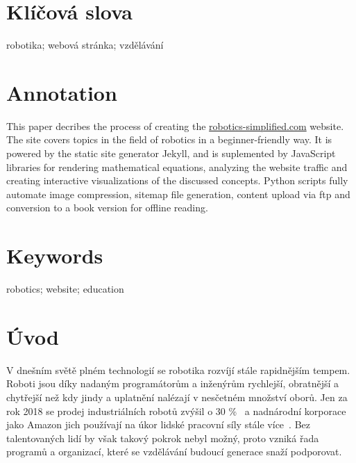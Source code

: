 \documentclass[a4paper, 12pt]{article}
\begin{document}
  \section*{\normalfont\textbf{Klíčová slova}}
  robotika; webová stránka; vzdělávání

  \section*{\normalfont\textbf{Annotation}}
  This paper decribes the process of creating the \url{robotics-simplified.com} website. The site covers topics in the field of robotics in a beginner-friendly way. It is powered by the static site generator Jekyll, and is suplemented by JavaScript libraries for rendering mathematical equations, analyzing the website traffic and creating interactive visualizations of the discussed concepts. Python scripts fully automate image compression, sitemap file generation, content upload via \acrshort{ftp} and conversion to a book version for offline reading.

  \section*{\normalfont\textbf{Keywords}}
  robotics; website; education

  \newpage

  \setcounter{savepage}{\value{page}}%

  \tableofcontents

  \newpage

  \printglossary[type=\acronymtype, title=Seznam zkratek]

  \newpage

  \section{Úvod}
  V dnešním světě plném technologií se robotika rozvíjí stále rapidnějším tempem. Roboti jsou díky nadaným programátorům a inženýrům rychlejší, obratnější a chytřejší než kdy jindy a uplatnění nalézají v nesčetném množství oborů. Jen za rok 2018 se prodej industriálních robotů zvýšil o 30 \%~\cite{industrial-robot-growth} a nadnárodní korporace jako Amazon jich používají na úkor lidské pracovní síly stále více~\cite{amazon-hiring}. Bez talentovaných lidí by však takový pokrok nebyl možný, proto vzniká řada programů a organizací, které se vzdělávání budoucí generace snaží podporovat.
\end{document}
